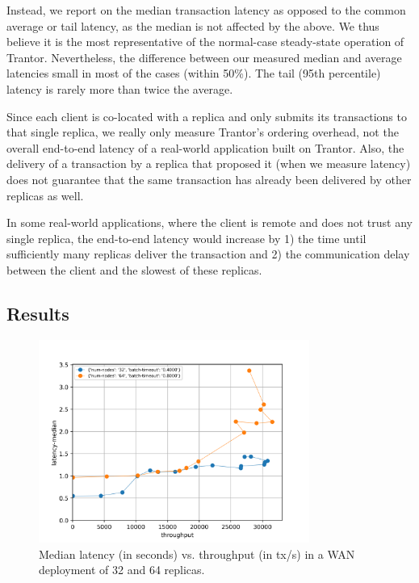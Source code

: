 \documentclass{article}
\begin{document}
Instead, we report on the median transaction latency as opposed to the common average or tail latency, as the median is not affected by the above.
We thus believe it is the most representative of the normal-case steady-state operation of Trantor.
Nevertheless, the difference between our measured median and average latencies small in most of the cases (within 50\%).
The tail (95th percentile) latency is rarely more than twice the average.

Since each client is co-located with a replica and only submits its transactions to that single replica,
we really only measure Trantor's ordering overhead, not the overall end-to-end latency of a real-world application built on Trantor.
Also, the delivery of a transaction by a replica that proposed it (when we measure latency)
does not guarantee that the same transaction has already been delivered by other replicas as well.

In some real-world applications, where the client is remote and does not trust any single replica,
the end-to-end latency would increase by
1) the time until sufficiently many replicas deliver the transaction and
2) the communication delay between the client and the slowest of these replicas.

\subsection{Results}

\begin{figure}
    \centering
    \includegraphics[width=0.79\textwidth]{figures/results-wan-final.png}
    \caption{\centering Median latency (in seconds) vs. throughput (in tx/s)\newline
    in a WAN deployment of 32 and 64 replicas.}
    \label{fig:eval-wan}
\end{figure}
\end{document}
